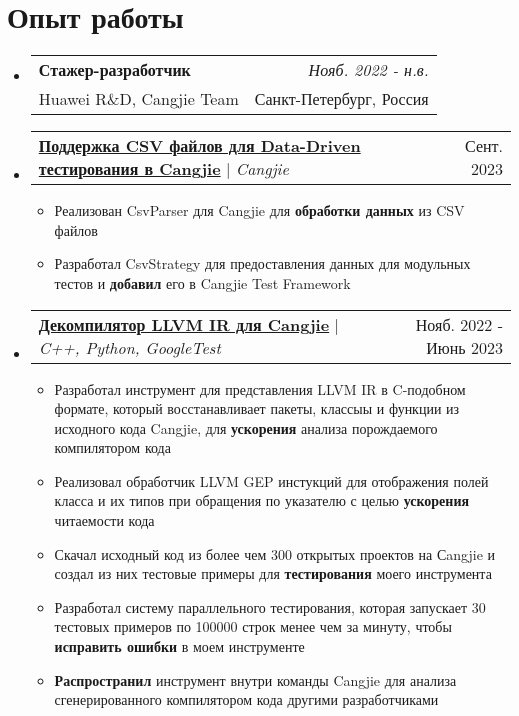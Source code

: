 \documentclass[english,russian,letterpaper,11pt]{article}
\makeatletter
\newcommand{\resumeItem}[1]{
  \item\small{
    {#1 \vspace{-2pt}}
  }
}
\newcommand{\resumeWorkExpHeading}[4]{
  \vspace{-2pt}\item
    \begin{tabular*}{0.97\textwidth}[t]{l@{\extracolsep{\fill}}r}
      \textbf{#1} & \textit{#2} \\
      #3 & #4 \\
    \end{tabular*}\vspace{-7pt}
}
\newcommand{\resumeProjectHeading}[2]{
    \item
    \begin{tabular*}{0.97\textwidth}{l@{\extracolsep{\fill}}r}
      \small#1 & #2 \\
    \end{tabular*}\vspace{-7pt}
}
\newcommand{\resumeSubHeadingListStart}{\begin{itemize}[leftmargin=0.15in, label={}]}
\newcommand{\resumeSubHeadingListEnd}{\end{itemize}}
\newcommand{\resumeItemListStart}{\begin{itemize}}
\newcommand{\resumeItemListEnd}{\end{itemize}\vspace{-5pt}}
\makeatother
\begin{document}
\section{Опыт работы}
    \resumeSubHeadingListStart
    \resumeWorkExpHeading
      {Стажер-разработчик}{Нояб. 2022 - н.в.}
      {Huawei R\&D, Cangjie Team}{Санкт-Петербург, Россия}
    \resumeProjectHeading
          {\underline{\textbf{Поддержка CSV файлов для Data-Driven тестирования в Cangjie}} $|$ \emph{Cangjie}}{Сент. 2023}
          \resumeItemListStart
            \resumeItem{Реализован CsvParser для Cangjie для \textbf{обработки данных} из CSV файлов}
            \resumeItem{Разработал CsvStrategy для предоставления данных для модульных тестов и \textbf{добавил} его в Cangjie Test Framework}
          \resumeItemListEnd
    \resumeProjectHeading
          {\underline{\textbf{Декомпилятор LLVM IR для Cangjie}} $|$ \emph{C++, Python, GoogleTest}}{Нояб. 2022 - Июнь 2023}
          \resumeItemListStart
            \resumeItem{Разработал инструмент для представления LLVM IR в C-подобном формате, который восстанавливает пакеты, классыы и функции из исходного кода Cangjie, для \textbf{ускорения} анализа порождаемого компилятором кода}
            \resumeItem{Реализовал обработчик LLVM GEP инстукций для отображения полей класса и их типов при обращения по указателю с целью \textbf{ускорения} читаемости кода}
            \resumeItem{Скачал исходный код из более чем 300 открытых проектов на Сangjie и создал из них тестовые примеры для \textbf{тестирования} моего инструмента}
            \resumeItem{Разработал систему параллельного тестирования, которая запускает 30 тестовых примеров по 100000 строк менее чем за минуту, чтобы \textbf{исправить ошибки} в моем инструменте}
            \resumeItem{\textbf{Распространил} инструмент внутри команды Cangjie для анализа сгенерированного компилятором кода другими разработчиками}
          \resumeItemListEnd
    \resumeSubHeadingListEnd

\end{document}
